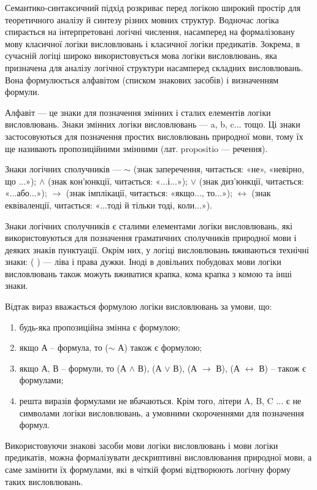 Семантико-синтаксичний підхід розкриває перед логікою широкий простір
для теоретичного аналізу й синтезу різних мовних структур. Водночас логіка
спирається на інтерпретовані логічні числення, насамперед на формалізовану
мову класичної логіки висловлювань і класичної логіки предикатів. Зокрема, в
сучасній логіці широко використовується мова логіки висловлювань, яка
призначена для аналізу логічної структури насамперед складних висловлювань.
Вона формулюється алфавітом (списком знакових засобів) і визначенням
формули.

Алфавіт --- це знаки для позначення змінних і сталих елементів логіки
висловлювань. Знаки змінних логіки висловлювань --- a, b, c... тощо. Ці знаки
застосовуються для позначення простих висловлювань природної мови, тому їх
ще називають пропозиційними змінними (лат. propositio --- речення).

Знаки логічних сполучників --- $\sim$ (знак заперечення, читається: «не»,
«невірно, що ...»); $\wedge$ (знак кон’юнкції, читається: «...і...»); $\vee$ (знак диз’юнкції,
читається: «...або...»); $\rightarrow$ (знак імплікації, читається: «якщо..., то...»);
$\leftrightarrow$ (знак еквіваленції, читається: «...тоді й тільки тоді, коли...»).

Знаки логічних сполучників є сталими елементами логіки висловлювань, які
використовуються для позначення граматичних сполучників природної мови і
деяких знаків пунктуації. Окрім них, у логіці висловлювань вживаються
технічні знаки: ( ) --- ліва і права дужки. Іноді в довільних побудовах мови
логіки висловлювань також можуть вживатися крапка, кома крапка з комою та
інші знаки.

Відтак вираз вважається формулою логіки висловлювань за умови, що:
\begin{enumerate}
	\item будь-яка пропозиційна змінна є формулою;
	
	\item якщо А – формула, то ($\sim$ А) також є формулою;

	\item якщо А, В – формули, то (А $\wedge$ В), (А $\vee$ В), (А $\rightarrow$ В),
	(А $\leftrightarrow$ В) – також є формулами;
	
	\item решта виразів формулами не вбачаються. Крім того, літери A, B, C ... є не
	символами логіки висловлювань, а умовними скороченнями для позначення
	формул.
\end{enumerate}

Використовуючи знакові засоби мови логіки висловлювань і мови логіки
предикатів, можна формалізувати дескриптивні висловлювання природної
мови, а саме замінити їх формулами, які в чіткій формі відтворюють логічну
форму таких висловлювань.

